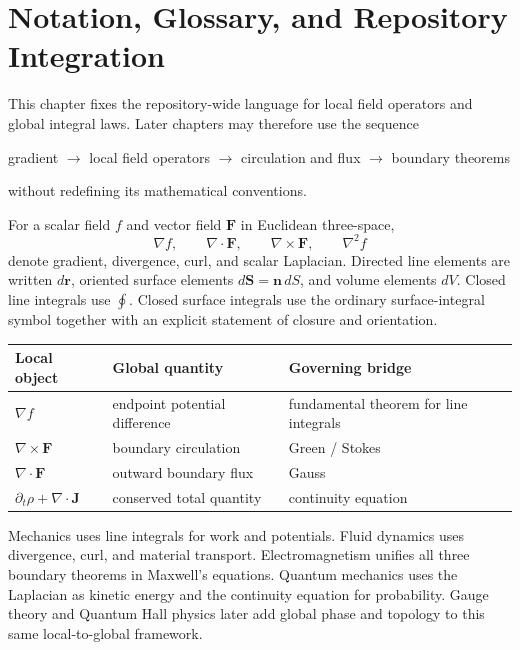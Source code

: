 \section{Notation, Glossary, and Repository Integration}
\label{sec:ch3-integration}

This chapter fixes the repository-wide language for local field operators and
global integral laws.  Later chapters may therefore use the sequence
\begin{center}
\gls{gradient} $\longrightarrow$ local field operators $\longrightarrow$ circulation and flux $\longrightarrow$ boundary theorems
\end{center}
without redefining its mathematical conventions.


\begin{bookrule}
For a scalar field $f$ and vector field $\mathbf F$ in Euclidean three-space,
\[
\nabla f,\qquad \nabla\cdot\mathbf F,\qquad
\nabla\times\mathbf F,\qquad \nabla^2 f
\]
denote gradient, divergence, curl, and scalar Laplacian.  Directed line elements
are written $d\mathbf r$, oriented surface elements $d\mathbf S=\mathbf n\,dS$,
and volume elements $dV$. Closed line integrals use $\oint$. Closed surface integrals use the ordinary surface-integral symbol together with an explicit statement of closure and orientation.
\end{bookrule}

\begin{center}
\begin{tabular}{@{}lll@{}}
\toprule
Local object & Global quantity & Governing bridge\\
\midrule
$\nabla f$ & endpoint potential difference & fundamental theorem for line integrals\\
$\nabla\times\mathbf F$ & boundary circulation & Green / Stokes\\
$\nabla\cdot\mathbf F$ & outward boundary flux & Gauss\\
$\partial_t\rho+\nabla\cdot\mathbf J$ & conserved total quantity & continuity equation\\
\bottomrule
\end{tabular}
\end{center}

\begin{bookinsight}
Mechanics uses line integrals for work and potentials.  Fluid dynamics uses
divergence, curl, and material transport.  Electromagnetism unifies all three
boundary theorems in Maxwell's equations.  Quantum mechanics uses the
Laplacian as kinetic energy and the continuity equation for probability.
Gauge theory and Quantum Hall physics later add global phase and topology to
this same local-to-global framework.
\end{bookinsight}

